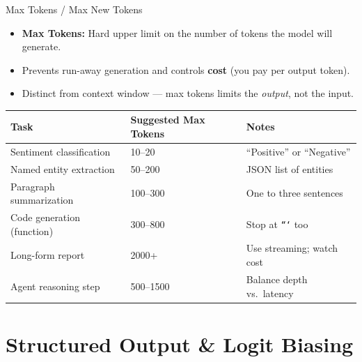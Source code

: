 \documentclass{beamer}
\begin{document}
\begin{frame}{Max Tokens / Max New Tokens}
    \begin{itemize}
        \item \textbf{Max Tokens:} Hard upper limit on the number of tokens the model will generate.
        \item Prevents run-away generation and controls \textbf{cost} (you pay per output token).
        \item Distinct from context window --- max tokens limits the \emph{output}, not the input.
    \end{itemize}

    \vspace{0.3cm}
    \begin{table}
        \centering
        \small
        \begin{tabular}{@{}lll@{}}
            \toprule
            \textbf{Task} & \textbf{Suggested Max Tokens} & \textbf{Notes} \\ \midrule
            Sentiment classification   & 10--20    & ``Positive'' or ``Negative''       \\
            Named entity extraction    & 50--200   & JSON list of entities              \\
            Paragraph summarization    & 100--300  & One to three sentences             \\
            Code generation (function) & 300--800  & Stop at \texttt{```} too           \\
            Long-form report           & 2000+     & Use streaming; watch cost          \\
            Agent reasoning step       & 500--1500 & Balance depth vs.\ latency         \\ \bottomrule
        \end{tabular}
    \end{table}
\end{frame}

\section{Structured Output \& Logit Biasing}
\end{document}
